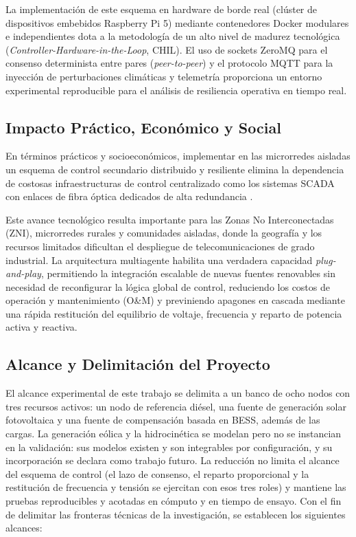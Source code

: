 La implementación de este esquema en hardware de borde real (clúster de dispositivos embebidos Raspberry Pi 5) mediante contenedores Docker modulares e independientes dota a la metodología de un alto nivel de madurez tecnológica (\textit{Controller-Hardware-in-the-Loop}, CHIL). El uso de sockets ZeroMQ para el consenso determinista entre pares (\textit{peer-to-peer}) y el protocolo MQTT para la inyección de perturbaciones climáticas y telemetría proporciona un entorno experimental reproducible para el análisis de resiliencia operativa en tiempo real.

\subsection{Impacto Práctico, Económico y Social}
En términos prácticos y socioeconómicos, implementar en las microrredes aisladas un esquema de control secundario distribuido y resiliente elimina la dependencia de costosas infraestructuras de control centralizado como los sistemas SCADA con enlaces de fibra óptica dedicados de alta redundancia \citep{Khayat2020}. 

Este avance tecnológico resulta importante para las Zonas No Interconectadas (ZNI), microrredes rurales y comunidades aisladas, donde la geografía y los recursos limitados dificultan el despliegue de telecomunicaciones de grado industrial. La arquitectura multiagente habilita una verdadera capacidad \textit{plug-and-play}, permitiendo la integración escalable de nuevas fuentes renovables sin necesidad de reconfigurar la lógica global de control, reduciendo los costos de operación y mantenimiento (O\&M) y previniendo apagones en cascada mediante una rápida restitución del equilibrio de voltaje, frecuencia y reparto de potencia activa y reactiva.

\subsection{Alcance y Delimitación del Proyecto}

El alcance experimental de este trabajo se delimita a un banco de ocho nodos con tres recursos activos: un nodo de referencia diésel, una fuente de generación solar fotovoltaica y una fuente de compensación basada en BESS, además de las cargas. La generación eólica y la hidrocinética se modelan pero no se instancian en la validación: sus modelos existen y son integrables por configuración, y su incorporación se declara como trabajo futuro. La reducción no limita el alcance del esquema de control (el lazo de consenso, el reparto proporcional y la restitución de frecuencia y tensión se ejercitan con esos tres roles) y mantiene las pruebas reproducibles y acotadas en cómputo y en tiempo de ensayo.
Con el fin de delimitar las fronteras técnicas de la investigación, se establecen los siguientes alcances:

